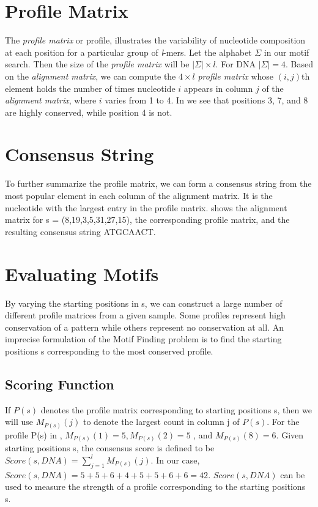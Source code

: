 \section{Profile Matrix}
The \textit{profile matrix} or profile, illustrates
the variability of nucleotide composition at each position for
a particular group of \textit{l}-mers. Let the alphabet $ \Sigma $
in our motif search. Then the size of the \textit{profile matrix} will be
$ | \Sigma | \times l$. For DNA $ | \Sigma | = 4$.  Based on the
\textit{alignment matrix}, we can compute the $ 4 \times l $
\textit{profile matrix} whose $ (i, j) $th element holds the
number of times nucleotide $ i $ appears in column
$ j $ of the \textit{alignment matrix}, where $ i $ varies from 1 to 4.
In  we see that positions 3, 7, and
8 are highly conserved, while position 4 is not.


\section{Consensus String}
To further summarize the profile matrix, we can form a consensus string from the most popular element in each column of the alignment matrix. It is the nucleotide with the largest entry in the profile matrix.  shows the alignment matrix for s = (8,19,3,5,31,27,15), the corresponding profile matrix, and the resulting
consensus string ATGCAACT.

\section{Evaluating Motifs}
By varying the starting positions in s, we can construct a large number of
different profile matrices from a given sample. Some profiles represent high conservation of a pattern while others represent no conservation at all. An imprecise formulation of the Motif Finding problem is to find the starting positions s corresponding to the most conserved profile. 

\subsection{Scoring Function}
If $ P(s) $ denotes the profile matrix corresponding to starting positions s, then
we will use $ M_{P(s)}(j) $ to denote the largest count in column j of $ P(s) $. For
the profile P(s) in , $ M_{P(s)}(1) = 5, M_{P(s)}(2) = 5$ , and  $ M_{P(s)}(8) = 6 $.
Given starting positions s, the consensus score is defined to be $ Score(s, DNA) =
\sum_{j=1}^{l}M_{P(s)}(j) $. In our case, $ Score(s, DNA) =
5 + 5 + 6 + 4 + 5 + 5 + 6 + 6 = 42 $. $  Score(s, DNA) $ can be used to measure the strength of a profile corresponding to the starting positions s.


